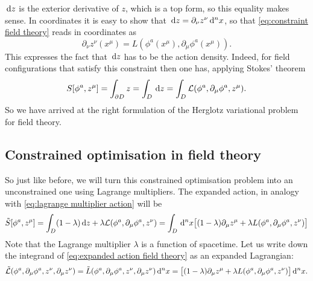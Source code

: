 \documentclass[../main.tex]{subfiles}
\begin{document}
\( \,\mathrm{d} z \) is the exterior derivative of \( z \), which is a top form, so this equality
makes sense. In coordinates it is easy to show that \( \,\mathrm{d} z = \partial_\nu z^\nu \,\mathrm{d}^n x
\), so that \cref{eq:constraint field theory} reads in coordinates as
\begin{equation} \label{eq:constraint field theory coordinates}
	\partial_\nu z^\nu (x^\mu) = L(\phi^a(x^\mu), \partial_\mu \phi^a(x^\mu)).
\end{equation}
This expresses the fact that \( \,\mathrm{d} z \) has to be the action density. Indeed, for field
configurations that satisfy this constraint then one has, applying Stokes' theorem
\begin{equation*}
	S[\phi^a, z^\mu] = \int_{\partial D} z = \int_D \,\mathrm{d} z = \int_D \mathcal{L}(\phi^a, \partial_\mu
	\phi^a, z^\mu). 
\end{equation*}
So we have arrived at the right formulation of the Herglotz variational problem for field
theory.

\subsection{Constrained optimisation in field theory}
So just like before, we will turn this constrained optimisation problem into an
unconstrained one using Lagrange multipliers. The expanded action, in analogy with
\cref{eq:lagrange multiplier action} will be
\begin{equation}\label{eq:expanded action field theory}
	\tilde{S}[\phi^a, z^\mu] = \int_D (1 - \lambda) \,\mathrm{d} z + \lambda \mathcal{L}(\phi^a, \partial_\mu
	\phi^a, z^\nu) = \int_D \,\mathrm{d}^n x \big[ (1 - \lambda) \partial_\mu z^\mu + \lambda L(\phi^a,
	\partial_\mu \phi^a, z^\nu) \big]
\end{equation}
Note that the Lagrange multiplier \( \lambda \) is a function of spacetime. Let us write
down the integrand of \cref{eq:expanded action field theory} as an expanded Lagrangian:
\begin{equation} \label{eq:expanded lagrangian field theory}
	\tilde{\mathcal{L}}(\phi^a, \partial_\mu \phi^a, z^\nu, \partial_\mu z^\nu) = \tilde{L}(\phi^a,
	\partial_\mu \phi^a, z^\nu, \partial_\mu z^\nu)\,\mathrm{d}^n x = \big[ (1 - \lambda)
	\partial_\mu z^\mu + \lambda L(\phi^a, \partial_\mu \phi^a, z^\nu) \big] \,\mathrm{d}^n x.
\end{equation}
\end{document}
